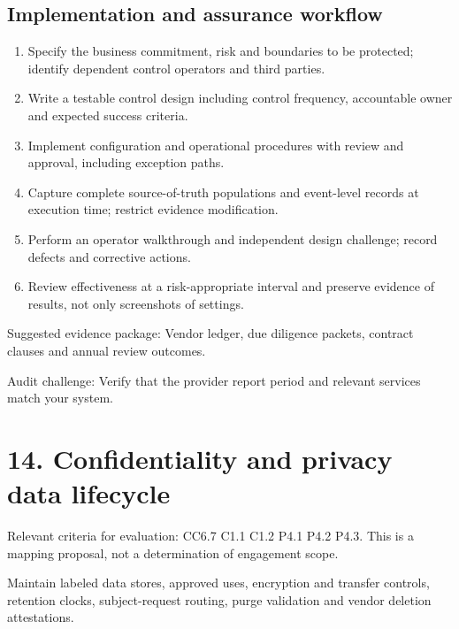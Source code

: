 \documentclass[10pt,oneside]{report}
\begin{document}
\subsection{Implementation and assurance workflow}
\begin{enumerate}
\item Specify the business commitment, risk and boundaries to be protected; identify dependent control operators and third parties.
\item Write a testable control design including control frequency, accountable owner and expected success criteria.
\item Implement configuration and operational procedures with review and approval, including exception paths.
\item Capture complete source-of-truth populations and event-level records at execution time; restrict evidence modification.
\item Perform an operator walkthrough and independent design challenge; record defects and corrective actions.
\item Review effectiveness at a risk-appropriate interval and preserve evidence of results, not only screenshots of settings.
\end{enumerate}

Suggested evidence package: Vendor ledger, due diligence packets, contract clauses and annual review outcomes.

Audit challenge: Verify that the provider report period and relevant services match your system.

\section{14. Confidentiality and privacy data lifecycle}
Relevant criteria for evaluation: CC6.7 C1.1 C1.2 P4.1 P4.2 P4.3. This is a mapping proposal, not a determination of engagement scope.

\begin{engineeringbox}
Maintain labeled data stores, approved uses, encryption and transfer controls, retention clocks, subject-request routing, purge validation and vendor deletion attestations.
\end{engineeringbox}
\end{document}
